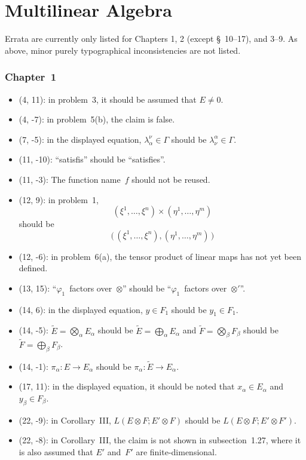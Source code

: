 \documentclass[letterpaper,12pt]{article}
\newcommand{\bigdsum}{\bigoplus}
\newcommand{\tprod}{\otimes}
\newcommand{\bigtprod}{\bigotimes}
\begin{document}
\newpage
\part*{Multilinear Algebra}
Errata are currently only listed for Chapters 1, 2 (except \S~10--17), and 3--9. As above, minor purely typographical inconsistencies are not listed.

\section*{Chapter~1}
\begin{itemize}
\item (4, 11): in problem~3, it should be assumed that \(E\ne 0\).
\item (4, -7): in problem~5(b), the claim is false.
\item (7, -5): in the displayed equation, \(\lambda^{\nu}_{\alpha}\in\Gamma\) should be \(\lambda^{\alpha}_{\nu}\in\Gamma\).
\item (11, -10): ``satisfis'' should be ``satisfies''.
\item (11, -3): The function name~\(f\) should not be reused.
\item (12, 9): in problem~1,
\[(\xi^1,\ldots,\xi^n)\times(\eta^1,\ldots,\eta^m)\]
should be
\[\bigl(\,(\xi^1,\ldots,\xi^n),(\eta^1,\ldots,\eta^m)\,\bigr)\]
\item (12, -6): in problem~6(a), the tensor product of linear maps has not yet been defined.
\item (13, 15): ``\(\varphi_1\)~factors over~\(\tprod\)'' should be ``\(\varphi_1\)~factors over~\(\tprod'\)''.
\item (14, 6): in the displayed equation, \(y\in F_1\) should be \(y_1\in F_1\).
\item (14, -5): \(\widetilde{E}=\bigtprod_{\alpha}E_{\alpha}\) should be \(\widetilde{E}=\bigdsum_{\alpha}E_{\alpha}\) and \(\widetilde{F}=\bigtprod_{\beta}F_{\beta}\) should be \(\widetilde{F}=\bigdsum_{\beta}F_{\beta}\).
\item (14, -1): \(\pi_{\alpha}:E\to E_{\alpha}\) should be \(\pi_{\alpha}:\widetilde{E}\to E_{\alpha}\).
\item (17, 11): in the displayed equation, it should be noted that \(x_{\alpha}\in E_{\alpha}\) and \(y_{\beta}\in F_{\beta}\).
\item (22, -9): in Corollary~III, \(L(E\tprod F;E'\tprod F)\) should be \(L(E\tprod F;E'\tprod F')\).
\item (22, -8): in Corollary~III, the claim is not shown in subsection~1.27, where it is also assumed that \(E'\) and~\(F'\) are finite-dimensional.

\end{itemize}
\end{document}
